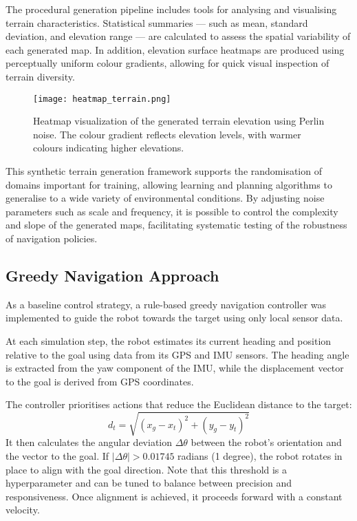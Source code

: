 \documentclass[conference]{IEEEtran}
\begin{document}
The procedural generation pipeline includes tools for analysing and visualising terrain characteristics. Statistical summaries — such as mean, standard deviation, and elevation range — are calculated to assess the spatial variability of each generated map. In addition, elevation surface heatmaps are produced using perceptually uniform colour gradients, allowing for quick visual inspection of terrain diversity.

\begin{figure}[htbp]
    \centering
    \texttt{[image: heatmap\_terrain.png]}
    \caption{Heatmap visualization of the generated terrain elevation using Perlin noise. The colour gradient reflects elevation levels, with warmer colours indicating higher elevations.}
    \label{fig:heatmap_terrain}
\end{figure}

This synthetic terrain generation framework supports the randomisation of domains important for training, allowing learning and planning algorithms to generalise to a wide variety of environmental conditions. By adjusting noise parameters such as scale and frequency, it is possible to control the complexity and slope of the generated maps, facilitating systematic testing of the robustness of navigation policies.

\subsection{Greedy Navigation Approach}

As a baseline control strategy, a rule-based greedy navigation controller was implemented to guide the robot towards the target using only local sensor data.

At each simulation step, the robot estimates its current heading and position relative to the goal using data from its GPS and IMU sensors. The heading angle is extracted from the yaw component of the IMU, while the displacement vector to the goal is derived from GPS coordinates.

The controller prioritises actions that reduce the Euclidean distance to the target:
\[
d_t = \sqrt{(x_g - x_t)^2 + (y_g - y_t)^2}
\]
It then calculates the angular deviation \(\Delta\theta\) between the robot's orientation and the vector to the goal. If \(|\Delta\theta| > 0.01745\) radians (1 degree), the robot rotates in place to align with the goal direction. Note that this threshold is a hyperparameter and can be tuned to balance between precision and responsiveness. Once alignment is achieved, it proceeds forward with a constant velocity.
\end{document}
